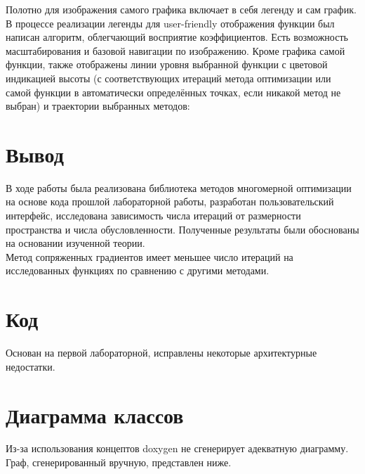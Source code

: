 \documentclass[russian, english]{article}
\begin{document}
Полотно для изображения самого графика включает в себя легенду и сам график. В процессе реализации легенды для user-friendly отображения функции был написан алгоритм, облегчающий восприятие коэффициентов. Есть возможность масштабирования и базовой навигации по изображению. Кроме графика самой функции, также отображены линии уровня выбранной функции с цветовой индикацией высоты (с соответствующих итераций метода оптимизации или самой функции в автоматически определённых точках, если никакой метод не выбран) и траектории выбранных методов:\\
\noindent{}

\newpage
\section{Вывод}
В ходе работы была реализована библиотека методов многомерной оптимизации на основе кода прошлой лабораторной работы, разработан пользовательский интерфейс, исследована зависимость числа итераций от размерности пространства и числа обусловленности. Полученные результаты были обоснованы на основании изученной теории. \\
Метод сопряженных градиентов имеет меньшее число итераций на исследованных функциях по сравнению с другими методами.

\appendix
\section{Код}
Основан на первой лабораторной, исправлены некоторые архитектурные недостатки.

\section{Диаграмма классов}
Из-за использования концептов doxygen не сгенерирует адекватную диаграмму. Граф, сгенерированный вручную, представлен ниже. \\
\noindent{}
%
\end{document}
